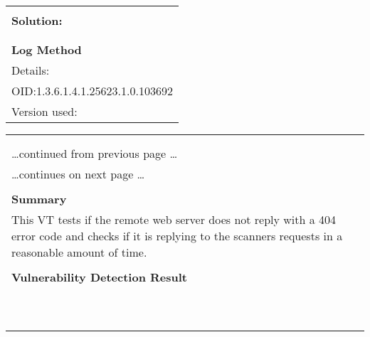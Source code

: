 \documentclass{article}
\begin{document}
\begin{longtable}{|p{}|}
          \hline
          \\
\textbf{Solution:}\\
\\


        \hline
        \\
\textbf{Log Method}\\
Details:
\rowcolor{white}{\verb=SSL/TLS: Collect and Report Certificate Details=}\\
OID:1.3.6.1.4.1.25623.1.0.103692\\
Version used:
\rowcolor{white}{\verb=2021-12-10T12:48:00Z=}\\
\end{longtable}

\begin{longtable}{|p{}|}
\hline
\rowcolor{gvm_log}{\color{white}{Log (CVSS: 0.0) }}\\
\rowcolor{gvm_log}{\color{white}{NVT: Response Time / No 404 Error Code Check}}\\
\hline
\endfirsthead
\hfill\ldots continued from previous page \ldots \\
\hline
\endhead
\hline
\ldots continues on next page \ldots \\
\endfoot
\hline
\endlastfoot
\\
\textbf{Summary}\\
This VT tests if the remote web server does not reply with a 404
  error code and checks if it is replying to the scanners requests in a reasonable amount of time.\\

        \hline
        \\
\textbf{Vulnerability Detection Result}\\
\rowcolor{white}{\verb=The remote web server is very slow - it took 83 seconds (Maximum response time c=}\\
\rowcolor{white}{$\hookrightarrow$\verb=onfigured in 'Response Time / No 404 Error Code Check' (OID: 1.3.6.1.4.1.25623=}\\
\rowcolor{white}{$\hookrightarrow$\verb=.1.0.10386) preferences: 60 seconds) to execute the plugin no404.nasl (it usua=}\\
\rowcolor{white}{$\hookrightarrow$\verb=lly only takes a few seconds).=}\\
\rowcolor{white}{\verb=In order to keep the scan total time to a reasonable amount, the remote web serv=}\\
\rowcolor{white}{$\hookrightarrow$\verb=er has not been tested.=}\\
\rowcolor{white}{\verb=If the remote server should be tested it has to be fixed to have it reply to the=}\\
\rowcolor{white}{$\hookrightarrow$\verb= scanners requests in a reasonable amount of time. Alternatively the 'Maximum =}\\
\rowcolor{white}{$\hookrightarrow$\verb=response time (in seconds)' preference could be raised to a higher value if lo=}\\
\rowcolor{white}{$\hookrightarrow$\verb=nger scan times are accepted.=}\\


\end{longtable}
\end{document}
